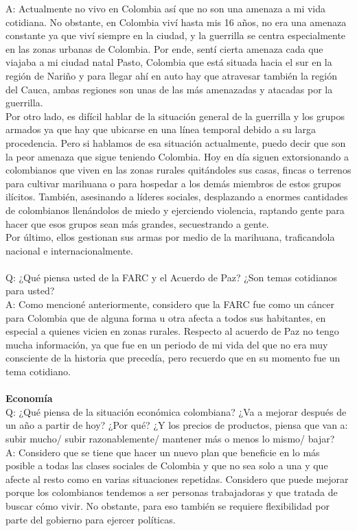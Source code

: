 \documentclass{phyasgn}\usepackage{nag}
\begin{document}
A: Actualmente no vivo en Colombia así que no son una amenaza a mi vida cotidiana. No obstante, en Colombia viví hasta mis 16 años, no era una amenaza constante ya que viví siempre en la ciudad, y la guerrilla se centra especialmente en las zonas urbanas de Colombia. Por ende, sentí cierta amenaza cada que viajaba a mi ciudad natal Pasto, Colombia que está situada hacia el sur en la región de Nariño y para llegar ahí en auto hay que atravesar también la región del Cauca, ambas regiones son unas de las más amenazadas y atacadas por la guerrilla. \\
Por otro lado, es difícil hablar de la situación general de la guerrilla y los grupos armados ya que hay que ubicarse en una línea temporal debido a su larga procedencia. Pero si hablamos de esa situación actualmente, puedo decir que son la peor amenaza que sigue teniendo Colombia. Hoy en día siguen extorsionando a colombianos que viven en las zonas rurales quitándoles sus casas, fincas o terrenos para cultivar marihuana o para hospedar a los demás miembros de estos grupos ilícitos. También, asesinando a líderes sociales, desplazando a enormes cantidades de colombianos llenándolos de miedo y ejerciendo violencia, raptando  gente para hacer que esos grupos sean más grandes, secuestrando a gente. \\
Por último, ellos gestionan sus armas por medio de la marihuana, traficandola nacional e internacionalmente.\\
\\
Q: ¿Qué piensa usted de la  FARC y el Acuerdo de Paz? ¿Son temas cotidianos para usted?\\
A: Como mencioné anteriormente, considero que la FARC fue como un cáncer para Colombia que de alguna forma u otra afecta a todos sus habitantes, en especial a quienes vicien en zonas rurales. Respecto al acuerdo de Paz no tengo mucha información, ya que fue en un periodo de mi vida del que no era muy consciente de la historia que precedía, pero recuerdo que en su momento fue un tema cotidiano. \\
\\
\textbf{Economía}\\
Q: ¿Qué piensa de la situación económica colombiana? ¿Va a mejorar después de un año a partir de hoy? ¿Por qué? ¿Y los precios de productos, piensa que van a: subir mucho/ subir razonablemente/ mantener más o menos lo mismo/ bajar?\\
A: Considero que se tiene que hacer un nuevo plan que beneficie en lo más posible a todas las clases sociales de Colombia y que no sea solo a una y que afecte al resto como en varias situaciones repetidas. Considero que puede mejorar porque los colombianos tendemos a ser personas trabajadoras y que tratada de buscar cómo vivir. No obstante, para eso también se requiere flexibilidad por parte del gobierno para ejercer políticas.\\
\end{document}
